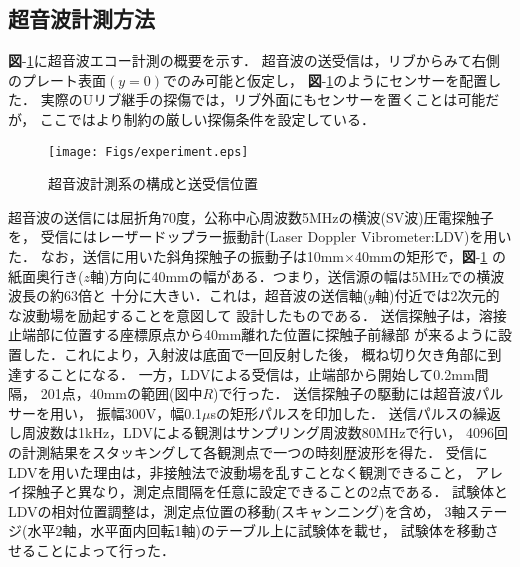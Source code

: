 \subsection{超音波計測方法}
{\bf 図}-\ref{fig:experiment}に超音波エコー計測の概要を示す．
超音波の送受信は，リブからみて右側のプレート表面$(y=0)$でのみ可能と仮定し，
{\bf 図}-\ref{fig:experiment}のようにセンサーを配置した．
実際のUリブ継手の探傷では，リブ外面にもセンサーを置くことは可能だが，
ここではより制約の厳しい探傷条件を設定している．
\begin{figure}[thb]
\centering
	\texttt{[image: Figs/experiment.eps]}
	\caption{超音波計測系の構成と送受信位置}
	\label{fig:experiment}
\end{figure}
超音波の送信には屈折角70度，公称中心周波数5MHzの横波(SV波)圧電探触子を，
受信にはレーザードップラー振動計(Laser Doppler Vibrometer:LDV)を用いた．
%
なお，送信に用いた斜角探触子の振動子は10mm$\times$40mmの矩形で，{\bf 図}-\ref{fig:experiment}
の紙面奥行き($z$軸)方向に40mmの幅がある．つまり，送信源の幅は5MHzでの横波波長の約63倍と
十分に大きい．これは，超音波の送信軸($y$軸)付近では2次元的な波動場を励起することを意図して
設計したものである．
%
送信探触子は，溶接止端部に位置する座標原点から40mm離れた位置に探触子前縁部
が来るように設置した．これにより，入射波は底面で一回反射した後，
概ね切り欠き角部に到達することになる．
一方，LDVによる受信は，止端部から開始して0.2mm間隔，
201点，40mmの範囲(図中$R$)で行った．
送信探触子の駆動には超音波パルサーを用い，
振幅300V，幅0.1$\mu$sの矩形パルスを印加した．
%
送信パルスの繰返し周波数は1kHz，LDVによる観測はサンプリング周波数80MHzで行い，
4096回の計測結果をスタッキングして各観測点で一つの時刻歴波形を得た．
%
受信にLDVを用いた理由は，非接触法で波動場を乱すことなく観測できること，
アレイ探触子と異なり，測定点間隔を任意に設定できることの2点である．
試験体とLDVの相対位置調整は，測定点位置の移動(スキャンニング)を含め，
3軸ステージ(水平2軸，水平面内回転1軸)のテーブル上に試験体を載せ，
試験体を移動させることによって行った．
